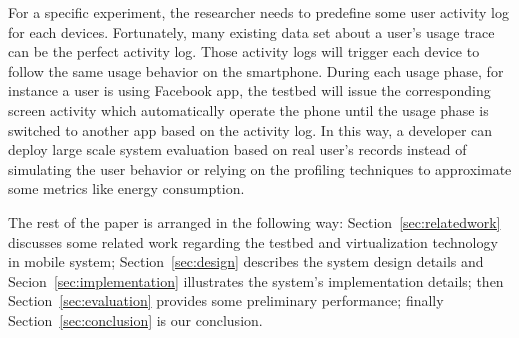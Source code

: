 For a specific experiment, the researcher needs to predefine some user activity log for each devices. Fortunately, many existing data set about a user's usage trace can be the perfect activity log. Those activity logs will trigger each device to follow the same usage behavior on the smartphone. During each usage phase, for instance a user is using Facebook app, the testbed will issue the corresponding screen activity which automatically operate the phone until the usage phase is switched to another app based on the activity log. In this way, a developer can deploy large scale system evaluation based on real user's records instead of simulating the user behavior or relying on the profiling techniques to approximate some metrics like energy consumption.

The rest of the paper is arranged in the following way: Section~\ref{sec:relatedwork} discusses some related work regarding the testbed and virtualization technology in mobile system; Section~\ref{sec:design} describes the system design details and Secion~\ref{sec:implementation} illustrates the system's implementation details; then Section~\ref{sec:evaluation} provides some preliminary performance; finally Section~\ref{sec:conclusion} is our conclusion.
